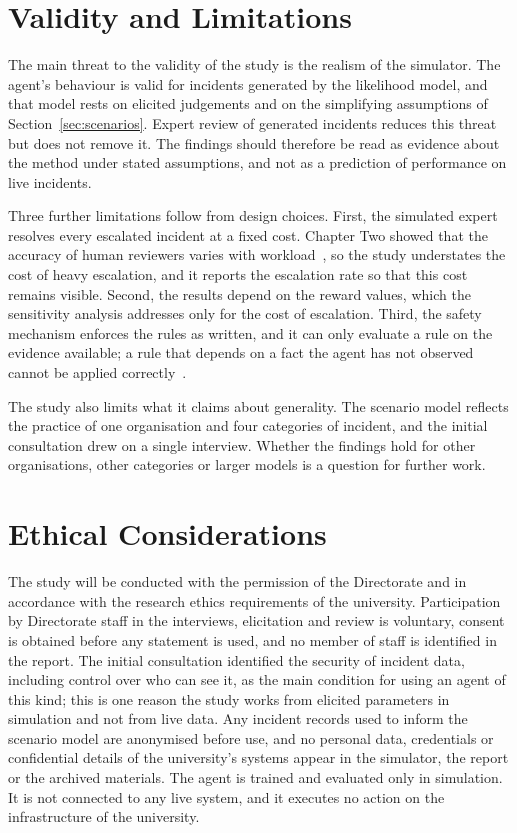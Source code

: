\section{Validity and Limitations}
\label{sec:validity}

The main threat to the validity of the study is the realism of the simulator. The agent's behaviour is valid for incidents generated by the likelihood model, and that model rests on elicited judgements and on the simplifying assumptions of Section~\ref{sec:scenarios}. Expert review of generated incidents reduces this threat but does not remove it. The findings should therefore be read as evidence about the method under stated assumptions, and not as a prediction of performance on live incidents.

Three further limitations follow from design choices. First, the simulated expert resolves every escalated incident at a fixed cost. Chapter Two showed that the accuracy of human reviewers varies with workload~\cite{zhang2026falcon,turan2026}, so the study understates the cost of heavy escalation, and it reports the escalation rate so that this cost remains visible. Second, the results depend on the reward values, which the sensitivity analysis addresses only for the cost of escalation. Third, the safety mechanism enforces the rules as written, and it can only evaluate a rule on the evidence available; a rule that depends on a fact the agent has not observed cannot be applied correctly~\cite{wugong2026}.

The study also limits what it claims about generality. The scenario model reflects the practice of one organisation and four categories of incident, and the initial consultation drew on a single interview. Whether the findings hold for other organisations, other categories or larger models is a question for further work.

\section{Ethical Considerations}

The study will be conducted with the permission of the Directorate and in accordance with the research ethics requirements of the university. Participation by Directorate staff in the interviews, elicitation and review is voluntary, consent is obtained before any statement is used, and no member of staff is identified in the report. The initial consultation identified the security of incident data, including control over who can see it, as the main condition for using an agent of this kind; this is one reason the study works from elicited parameters in simulation and not from live data. Any incident records used to inform the scenario model are anonymised before use, and no personal data, credentials or confidential details of the university's systems appear in the simulator, the report or the archived materials. The agent is trained and evaluated only in simulation. It is not connected to any live system, and it executes no action on the infrastructure of the university.

